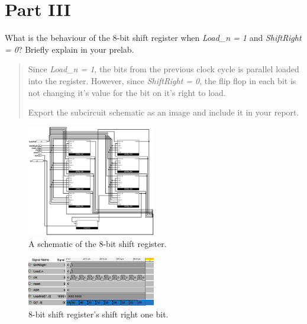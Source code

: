 \documentclass{article}
\begin{document}
\section*{Part III}
\begin{enumerate}
\setcounter{enumi}{1}
\item What is the behaviour of the 8-bit shift register when \textit{Load\_n = 1} and \textit{ShiftRight = 0}? Briefly explain in your prelab. 
\begin{quote}
Since \textit{Load\_n = 1}, the bits from the previous clock cycle is parallel loaded into the register. However, since \textit{ShiftRight = 0}, the flip flop in each bit is not changing it's value for the bit on it's right to load.
\item Export the subcircuit schematic as an image and include it in your report.
\end{quote}

\begin{figure}[ht!]
    \centering
    \includegraphics[width=0.5\textwidth]{lab4_shifter_bit.png}
    \caption{A schematic of the 8-bit shift register.}
    \label{f:shifter_bit}
\end{figure}


\begin{figure}[ht!]
    \centering
    \includegraphics[width=0.5\textwidth]{lab4_timing_shift_right_one_bit.png}
    \caption{8-bit shift register's shift right one bit.}
    \label{f:timing_shifter_bit}
\end{figure}



\end{enumerate}
\end{document}
